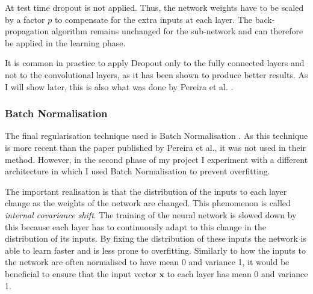 \documentclass[12pt,a4paper,twoside,openright]{report}
\begin{document}
At test time dropout is not applied. Thus, the network weights have to be scaled by a factor $p$ to compensate for the extra inputs at each layer. The back-propagation algorithm remains unchanged for the sub-network and can therefore be applied in the learning phase.

It is common in practice to apply Dropout only to the fully connected layers and not to the convolutional layers, as it has been shown to produce better results. As I will show later, this is also what was done by Pereira et al. \cite{pereira}.

\subsubsection{Batch Normalisation}
The final regularisation technique used is Batch Normalisation \cite{batch_normalization}. As this technique is more recent than the paper published by Pereira et al., it was not used in their method. However, in the second phase of my project I experiment with a different architecture in which I used Batch Normalisation to prevent overfitting.

The important realisation is that the distribution of the inputs to each layer change as the weights of the network are changed. This phenomenon is called \textit{internal covariance shift}. The training of the neural network is slowed down by this because each layer has to continuously adapt to this change in the distribution of its inputs. By fixing the distribution of these inputs the network is able to learn faster and is less prone to overfitting. Similarly to how the inputs to the network are often normalised to have mean 0 and variance 1, it would be beneficial to ensure that the input vector $\textbf{x}$ to each layer has mean 0 and variance 1. 
\end{document}
